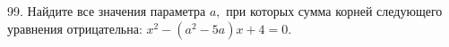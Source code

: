 99. Найдите все значения параметра $a,$ при которых сумма корней следующего уравнения отрицательна: $x^2-(a^2-5a)x+4=0.$\\
